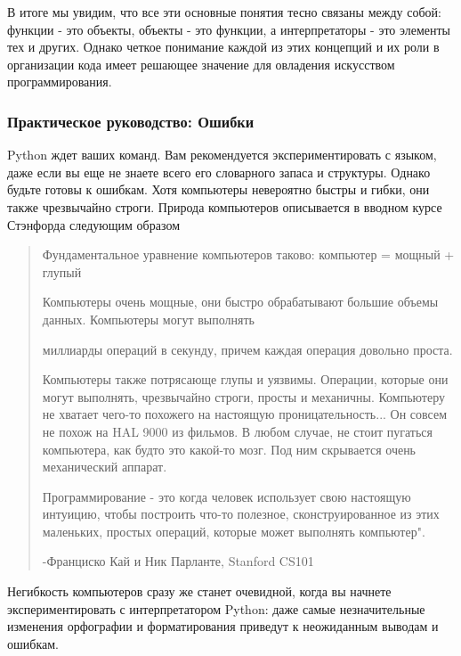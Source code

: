 В итоге мы увидим, что все эти основные понятия тесно связаны между собой: функции - это объекты, объекты - это функции, а интерпретаторы - это элементы тех и других. Однако четкое понимание каждой из этих концепций и их роли в организации кода имеет решающее значение для овладения искусством программирования.

\subsubsection{Практическое руководство: Ошибки}
Python ждет ваших команд. Вам рекомендуется экспериментировать с языком, даже если вы еще не знаете всего его словарного запаса и структуры. Однако будьте готовы к ошибкам. Хотя компьютеры невероятно быстры и гибки, они также чрезвычайно строги. Природа компьютеров описывается в вводном курсе Стэнфорда следующим образом

\begin{quotation}
Фундаментальное уравнение компьютеров таково: компьютер = мощный + глупый

Компьютеры очень мощные, они быстро обрабатывают большие объемы данных. Компьютеры могут выполнять

миллиарды операций в секунду, причем каждая операция довольно проста.

Компьютеры также потрясающе глупы и уязвимы. Операции, которые они могут выполнять, чрезвычайно строги, просты и механичны. Компьютеру не хватает чего-то похожего на настоящую проницательность... Он совсем не похож на HAL 9000 из фильмов. В любом случае, не стоит пугаться компьютера, как будто это какой-то мозг. Под ним скрывается очень механический аппарат.

Программирование - это когда человек использует свою настоящую интуицию, чтобы построить что-то полезное, сконструированное из этих маленьких, простых операций, которые может выполнять компьютер".

-Франциско Кай и Ник Парланте, Stanford CS101
\end{quotation}

Негибкость компьютеров сразу же станет очевидной, когда вы начнете экспериментировать с интерпретатором Python: даже самые незначительные изменения орфографии и форматирования приведут к неожиданным выводам и ошибкам.

